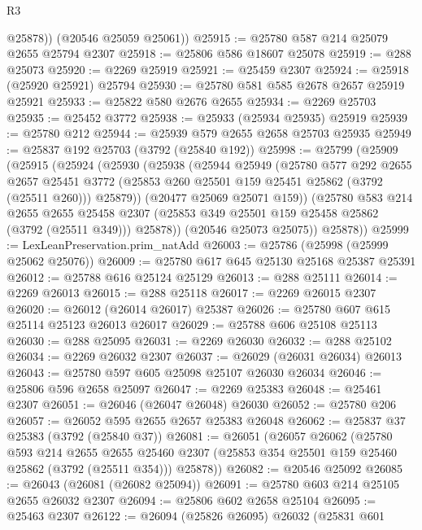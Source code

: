 \begin{lexlean}{R3}
\begin{coremodule}
          @25878))
      (@20546 @25059 @25061))
@25915 := @25780 @587 @214 @25079 @2655 @25794 @2307
@25918 := @25806 @586 @18607 @25078
@25919 := @288 @25073
@25920 := @2269 @25919
@25921 := @25459 @2307
@25924 := @25918 (@25920 @25921) @25794
@25930 := @25780 @581 @585 @2678 @2657 @25919 @25921
@25933 := @25822 @580 @2676 @2655
@25934 := @2269 @25703
@25935 := @25452 @3772
@25938 := @25933 (@25934 @25935) @25919
@25939 := @25780 @212
@25944 := @25939 @579 @2655 @2658 @25703 @25935
@25949 := @25837 @192 @25703 (@3792 (@25840 @192))
@25998 := @25799
    (@25909
      (@25915
        (@25924
          (@25930
            (@25938
              (@25944
                @25949
                (@25780
                  @577
                  @292
                  @2655
                  @2657
                  @25451
                  @3772
                  (@25853 @260 @25501 @159 @25451 @25862 (@3792 (@25511 @260)))
                  @25879))
              (@20477 @25069 @25071 @159))
            (@25780
              @583
              @214
              @2655
              @2655
              @25458
              @2307
              (@25853 @349 @25501 @159 @25458 @25862 (@3792 (@25511 @349)))
              @25878))
          (@20546 @25073 @25075))
        @25878))
@25999 := LexLeanPreservation.prim_natAdd
@26003 := @25786 (@25998 (@25999 @25062 @25076))
@26009 := @25780 @617 @645 @25130 @25168 @25387 @25391
@26012 := @25788 @616 @25124 @25129
@26013 := @288 @25111
@26014 := @2269 @26013
@26015 := @288 @25118
@26017 := @2269 @26015 @2307
@26020 := @26012 (@26014 @26017) @25387
@26026 := @25780 @607 @615 @25114 @25123 @26013 @26017
@26029 := @25788 @606 @25108 @25113
@26030 := @288 @25095
@26031 := @2269 @26030
@26032 := @288 @25102
@26034 := @2269 @26032 @2307
@26037 := @26029 (@26031 @26034) @26013
@26043 := @25780 @597 @605 @25098 @25107 @26030 @26034
@26046 := @25806 @596 @2658 @25097
@26047 := @2269 @25383
@26048 := @25461 @2307
@26051 := @26046 (@26047 @26048) @26030
@26052 := @25780 @206
@26057 := @26052 @595 @2655 @2657 @25383 @26048
@26062 := @25837 @37 @25383 (@3792 (@25840 @37))
@26081 := @26051
    (@26057
      @26062
      (@25780
        @593
        @214
        @2655
        @2655
        @25460
        @2307
        (@25853 @354 @25501 @159 @25460 @25862 (@3792 (@25511 @354)))
        @25878))
@26082 := @20546 @25092
@26085 := @26043 (@26081 (@26082 @25094))
@26091 := @25780 @603 @214 @25105 @2655 @26032 @2307
@26094 := @25806 @602 @2658 @25104
@26095 := @25463 @2307
@26122 := @26094
    (@25826 @26095)
    @26032
    (@25831
      @601

\end{coremodule}
\end{lexlean}

